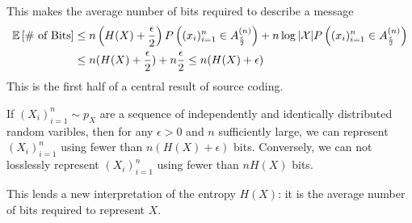 This makes the average number of bits required to describe a message 
\begin{align*}
	\mathbb{E}\left[\text{\# of Bits}\right] &\leq n\left(H(X)+\frac{\epsilon}{2}\right)P\left((x_i)_{i=1}^n\in A_{\frac{\epsilon}{2}}^{(n)}\right) + n\log |\mathcal{X}|P\left((x_i)_{i=1}^n\in A_{\frac{\epsilon}{2}}^{(n)}\right) \\
	&\leq n(H(X)+\frac{\epsilon}{2}) + n \frac{\epsilon}{2} \leq n(H(X)+\epsilon)
\end{align*}
This is the first half of a central result of source coding.
\begin{theorem}
	If $(X_i)_{i=1}^n \sim p_X$ are a sequence of independently and identically distributed random varibles, then for any $\epsilon > 0$ and $n$ sufficiently large, we can represent $(X_i)_{i=1}^n$ using fewer than $n(H(X) + \epsilon)$ bits. Conversely, we can not losslessly represent $(X_i)_{i=1}^n$ using fewer than $nH(X)$ bits.
	\label{thm:source-coding}
\end{theorem}
This lends a new interpretation of the entropy $H(X)$: it is the average number of bits required to represent $X$.
